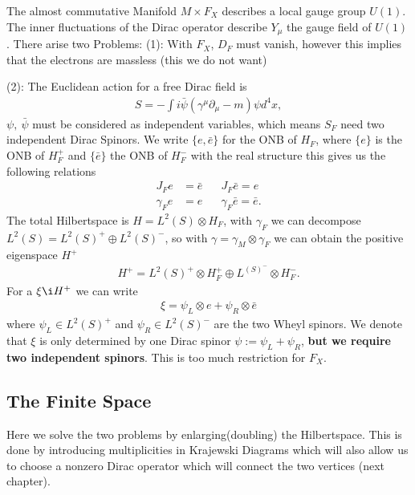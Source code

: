 \documentclass[a4paper]{article}
\theoremstyle{definition}
\theoremstyle{definition}
\theoremstyle{definition}
\theoremstyle{theorem}
\theoremstyle{theorem}
\theoremstyle{theorem}
\begin{document}
The almost commutative Manifold $M\times F_X$ describes a local gauge group
$U(1)$. The inner fluctuations of the Dirac operator describe $Y_\mu$ the
gauge field of $U(1)$. There arise two Problems:
\newline
(1): With $F_X$, $D_F$ must vanish, however this implies that the electrons
are massless (this we do not want)
\newline

(2): The Euclidean action for a free Dirac field is
\begin{align}
    S = - \int i \bar{\psi}(\gamma ^\mu\partial _\mu - m) \psi d^4x,
\end{align}
$\psi,\ \bar{\psi}$ must be considered as independent variables, which means
$S_F$ need two independent Dirac Spinors. We write $\{e, \bar{e}\}$ for the
ONB of $H_F$, where $\{e\}$ is the ONB of $H_F^+$ and $\{\bar{e}\}$ the ONB
of $H_F^-$ with the real structure this gives us the following relations
\begin{align}
    J_F e &= \bar{e} \;\;\;\;\;\; J_F \bar{e} = e \\
    \gamma_F e &= e  \;\;\;\;\;\;   \gamma_F \bar{e} = \bar{e}.
\end{align}
The total Hilbertspace is $H = L^2(S) \otimes H_F$, with $\gamma _F$ we can
decompose $L^2(S) = L^2(S)^+ \oplus L^2(S)^-$, so with $\gamma = \gamma _M
\otimes \gamma _F$ we can obtain the positive eigenspace $H^+$
\begin{align}
    H^+ = L^2(S)^+ \otimes H_F^+ \oplus L^(S)^- \otimes H_F^-.
\end{align}
For a $\xi \i H^+$ we can write
\begin{align}
    \xi = \psi _L \otimes e + \psi _R \otimes \bar{e}
\end{align}
where $\psi _L \in L^2(S)^+$ and $\psi _R \in L^2(S)^-$ are the two Wheyl
spinors. We denote that $\xi$ is only determined by one Dirac spinor $\psi :=
\psi_L + \psi _R$, \textbf{but we require two independent spinors}. This is
too much restriction for $F_X$.
\subsection{The Finite Space}
Here we solve the two problems by enlarging(doubling) the Hilbertspace. This
is done by introducing multiplicities in Krajewski Diagrams which will also
allow us to choose a nonzero Dirac operator which will connect the two
vertices (next chapter).
\newline
\end{document}
